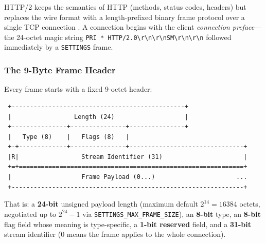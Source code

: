 HTTP/2 keeps the semantics of HTTP (methods, status codes, headers) but replaces the wire format with a length-prefixed binary frame protocol over a single TCP connection \cite{rfc9113}. A connection begins with the client \emph{connection preface}---the 24-octet magic string \texttt{PRI * HTTP/2.0\textbackslash r\textbackslash n\textbackslash r\textbackslash nSM\textbackslash r\textbackslash n\textbackslash r\textbackslash n} followed immediately by a \texttt{SETTINGS} frame.

\subsubsection{The 9-Byte Frame Header}

Every frame starts with a fixed 9-octet header:

\begin{verbatim}
 +-----------------------------------------------+
 |                 Length (24)                   |
 +---------------+---------------+---------------+
 |   Type (8)    |   Flags (8)   |
 +-+-------------+---------------+-------------------------------+
 |R|                 Stream Identifier (31)                      |
 +=+=============================================================+
 |                   Frame Payload (0...)                      ...
 +---------------------------------------------------------------+
\end{verbatim}

That is: a \textbf{24-bit} unsigned payload length (maximum default $2^{14} = 16384$ octets, negotiated up to $2^{24}-1$ via \texttt{SETTINGS\_MAX\_FRAME\_SIZE}), an \textbf{8-bit} type, an \textbf{8-bit} flag field whose meaning is type-specific, a \textbf{1-bit reserved} field, and a \textbf{31-bit} stream identifier (0 means the frame applies to the whole connection).

